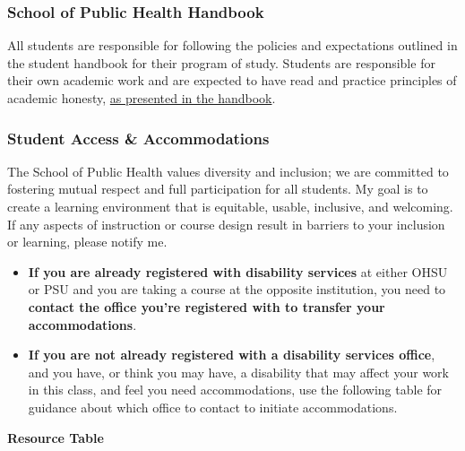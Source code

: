 \documentclass[
  letterpaper,
  DIV=11,
  numbers=noendperiod]{scrartcl}
\begin{document}
\subsubsection{School of Public Health
Handbook}\label{school-of-public-health-handbook}

All students are responsible for following the policies and expectations
outlined in the student handbook for their program of study. Students
are responsible for their own academic work and are expected to have
read and practice principles of academic honesty,
\href{https://ohsu-psu-sph.org/current-graduate-students/policies-procedures/}{as
presented in the handbook}.

\subsubsection{Student Access \&
Accommodations}\label{student-access-accommodations}

The School of Public Health values diversity and inclusion; we are
committed to fostering mutual respect and full participation for all
students. My goal is to create a learning environment that is equitable,
usable, inclusive, and welcoming. If any aspects of instruction or
course design result in barriers to your inclusion or learning, please
notify me.~

\begin{itemize}
\item
  \textbf{If you are already registered with disability services} at
  either OHSU or PSU and you are taking a course at the opposite
  institution, you need to \textbf{contact the office you're registered
  with to transfer your accommodations}.
\item
  \textbf{If you are not already registered with a disability services
  office}, and you have, or think you may have, a disability that may
  affect your work in this class, and feel you need accommodations, use
  the following table for guidance about which office to contact to
  initiate accommodations.
\end{itemize}

\textbf{Resource Table}
\end{document}
